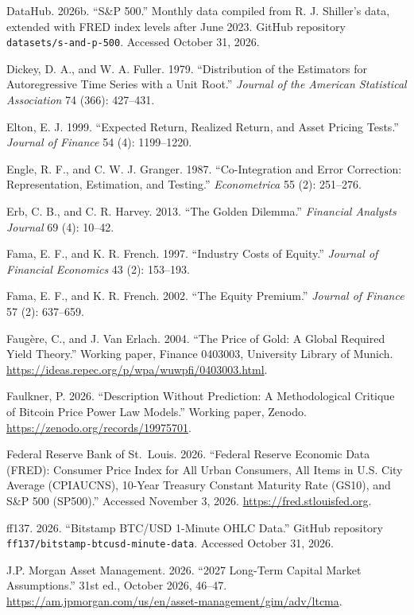 \documentclass[12pt]{article}
\DeclareRobustCommand{\chg}[1]{{\color{blue}#1}}
\theoremstyle{plain}
\theoremstyle{remark}
\begin{document}
\chg{DataHub. 2026b. ``S\&P 500.'' Monthly data compiled from R. J. Shiller's data, extended with FRED index levels after June 2023. GitHub repository \texttt{datasets/s-and-p-500}. Accessed October 31, 2026.}

\chg{Dickey, D. A., and W. A. Fuller. 1979. ``Distribution of the Estimators for Autoregressive Time Series with a Unit Root.'' \emph{Journal of the American Statistical Association} 74 (366): 427--431.}

\chg{Elton, E. J. 1999. ``Expected Return, Realized Return, and Asset Pricing Tests.'' \emph{Journal of Finance} 54 (4): 1199--1220.}

\chg{Engle, R. F., and C. W. J. Granger. 1987. ``Co-Integration and Error Correction: Representation, Estimation, and Testing.'' \emph{Econometrica} 55 (2): 251--276.}

\chg{Erb, C. B., and C. R. Harvey. 2013. ``The Golden Dilemma.'' \emph{Financial Analysts Journal} 69 (4): 10--42.}

\chg{Fama, E. F., and K. R. French. 1997. ``Industry Costs of Equity.'' \emph{Journal of Financial Economics} 43 (2): 153--193.}

\chg{Fama, E. F., and K. R. French. 2002. ``The Equity Premium.'' \emph{Journal of Finance} 57 (2): 637--659.}

\chg{Faug\`{e}re, C., and J. Van Erlach. 2004. ``The Price of Gold: A Global Required Yield Theory.'' Working paper, Finance 0403003, University Library of Munich. \url{https://ideas.repec.org/p/wpa/wuwpfi/0403003.html}.}

\chg{Faulkner, P. 2026. ``Description Without Prediction: A Methodological Critique of Bitcoin Price Power Law Models.'' Working paper, Zenodo. \url{https://zenodo.org/records/19975701}.}

\chg{Federal Reserve Bank of St.\ Louis. 2026. ``Federal Reserve Economic Data (FRED): Consumer Price Index for All Urban Consumers, All Items in U.S. City Average (CPIAUCNS), 10-Year Treasury Constant Maturity Rate (GS10), and S\&P 500 (SP500).'' Accessed November 3, 2026. \url{https://fred.stlouisfed.org}.}

\chg{ff137. 2026. ``Bitstamp BTC/USD 1-Minute OHLC Data.'' GitHub repository \texttt{ff137/bitstamp-btcusd-minute-data}. Accessed October 31, 2026.}

\chg{J.P. Morgan Asset Management. 2026. ``2027 Long-Term Capital Market Assumptions.'' 31st ed., October 2026, 46--47. \url{https://am.jpmorgan.com/us/en/asset-management/gim/adv/ltcma}.}
\end{document}
